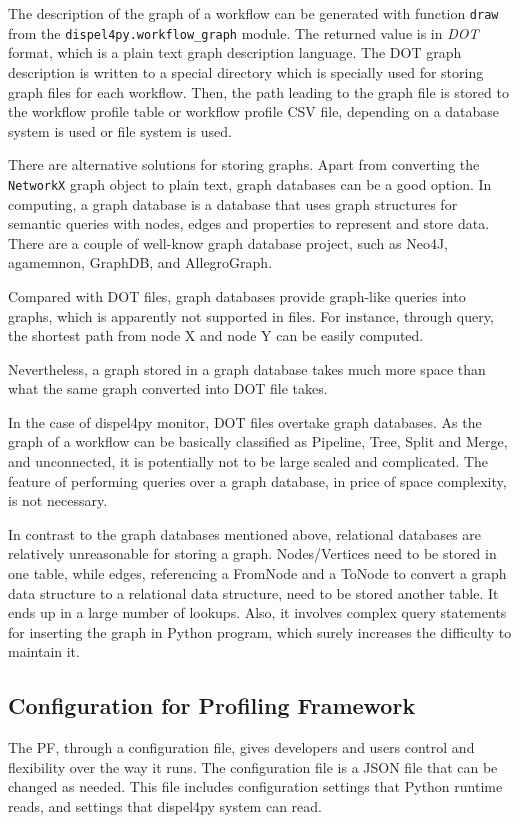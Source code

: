 \documentclass[10pt,twoside,openright,logo]{report}
\begin{document}
The description of the graph of a workflow can be generated with function \texttt{draw} from the \texttt{dispel4py.workflow_graph} module. The returned value is in \textit{DOT} format, which is a plain text graph description language.
The DOT graph description is written to a special directory which is specially used for storing graph files for each workflow. Then, the path leading to the graph file is stored to the workflow profile table or workflow profile CSV file, depending on a database system is used or file system is used.

There are alternative solutions for storing graphs. Apart from converting the \texttt{NetworkX} graph object to plain text, graph databases can be a good option. In computing, a graph database is a database that uses graph structures for semantic queries with nodes, edges and properties to represent and store data. There are a couple of well-know graph database project, such as Neo4J, agamemnon, GraphDB, and AllegroGraph.

Compared with DOT files, graph databases provide graph-like queries into graphs, which is apparently not supported in files. For instance, through query, the shortest path from node X and node Y can be easily computed.

Nevertheless, a graph stored in a graph database takes much more space than what the same graph converted into DOT file takes.

In the case of dispel4py monitor, DOT files overtake graph databases. As the graph of a workflow can be basically classified as Pipeline, Tree, Split and Merge, and unconnected, it is potentially not to be large scaled and complicated. The feature of performing queries over a graph database, in price of space complexity, is not necessary.

In contrast to the graph databases mentioned above, relational databases are relatively unreasonable for storing a graph. Nodes/Vertices need to be stored in one table, while edges, referencing a FromNode and a ToNode to convert a graph data structure to a relational data structure, need to be stored another table. It ends up in a large number of lookups. Also, it involves complex query statements for inserting the graph in Python program, which surely increases the difficulty to maintain it.

\subsection{Configuration for Profiling Framework}
The PF, through a configuration file, gives developers and users control and flexibility over the way it runs. The configuration file is a JSON file that can be changed as needed. This file includes configuration settings that Python runtime reads, and settings that dispel4py system can read.
\end{document}
